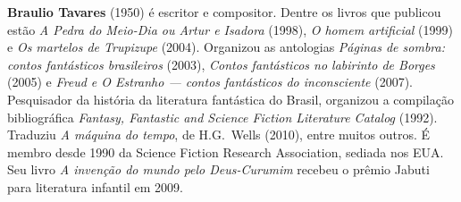 {\noindent\textbf{Braulio Tavares} (1950) é escritor e compositor. Dentre os livros que publicou estão \textit{A Pedra do 
Meio-Dia ou Artur e Isadora} (1998), \textit{O homem artificial} (1999) e \textit{Os martelos de Trupizupe}
(2004). Organizou as antologias \textit{Páginas de sombra: contos fantásticos brasileiros} (2003), 
\textit{Contos fantásticos no labirinto de Borges} (2005) e \textit{Freud e 
O Estranho --- contos fantásticos do inconsciente} (2007). Pesquisador da história da literatura fantástica 
do Brasil, organizou a compilação bibliográfica \textit{Fantasy, Fantastic and 
Science Fiction Literature Catalog} (1992). Traduziu \textit{A máquina do tempo}, 
de H.G.~Wells (2010), entre muitos outros. É membro desde 1990 da Science 
Fiction Research Association, sediada nos EUA. Seu livro \textit{A invenção do mundo pelo Deus-Curumim} 
recebeu o prêmio Jabuti para literatura infantil em 2009.

}



